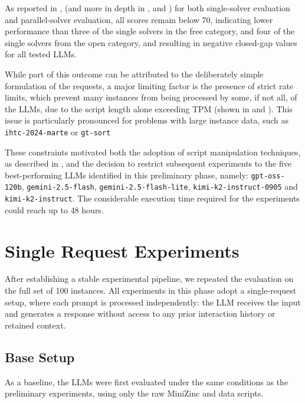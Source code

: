 \documentclass[../../main]{subfiles}
\begin{document}
As reported in , (and more in depth in ,  and ) for both single-solver evaluation and parallel-solver evaluation, all scores remain below 70, indicating lower performance than three of the single solvers in the free category, and four of the single solvers from the open category, and resulting in negative closed-gap values for all tested LLMs. 

While part of this outcome can be attributed to the deliberately simple formulation of the requests, a major limiting factor is the presence of strict rate limits, which prevent many instances from being processed by some, if not all, of the LLMs, due to the script length alone exceeding TPM (shown in  and ). This issue is particularly pronounced for problems with large instance data, such as \texttt{ihtc-2024-marte} or \texttt{gt-sort}

These constraints motivated both the adoption of script manipulation techniques, as described in , and the decision to restrict subsequent experiments to the five best-performing LLMs identified in this preliminary phase, namely: \texttt{gpt-oss-120b}, \texttt{gemini-2.5-flash}, \texttt{gemini-2.5-flash-lite}, \texttt{kimi-k2-instruct-0905} and \texttt{kimi-k2-instruct}. The considerable execution time required for the experiments could reach up to 48 hours.

\section{Single Request Experiments}
After establishing a stable experimental pipeline, we repeated the evaluation on the full set of 100 instances. All experiments in this phase adopt a single-request setup, where each prompt is processed independently: the LLM receives the input and generates a response without access to any prior interaction history or retained context.

\subsection{Base Setup}
As a baseline, the LLMs were first evaluated under the same conditions as the preliminary experiments, using only the raw MiniZinc and data scripts.
\end{document}
